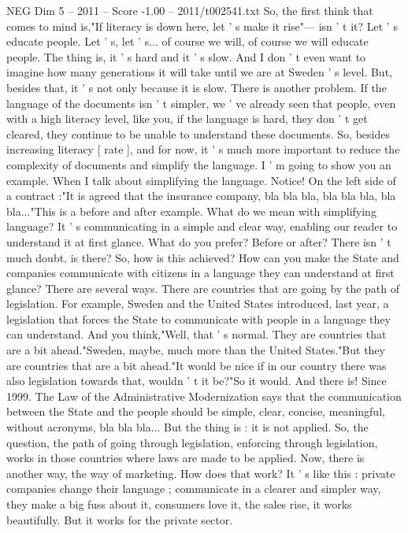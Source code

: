\begin{textsample}{NEG Dim 5 – 2011 – Score -1.00 – 2011/t002541.txt}
So, the first think that comes to mind is,"If literacy is down here, let ' s make it rise"— isn ' t it?
Let ' s educate people.
Let ' s, let ' s... of course we will, of course we will educate people.
The thing is, it ' s hard and it ' s slow.
And I don ' t even want to imagine how many generations it will take until we are at Sweden ' s level.
But, besides that, it ' s not only because it is slow.
There is another problem.
If the language of the documents isn ' t simpler, we ' ve already seen that people, even with a high literacy level, like you, if the language is hard, they don ' t get cleared, they continue to be unable to understand these documents.
So, besides increasing literacy [ rate ], and for now, it ' s much more important to reduce the complexity of documents and simplify the language.
I ' m going to show you an example.
When I talk about simplifying the language.
Notice!
On the left side of a contract :"It is agreed that the insurance company, bla bla bla, bla bla bla, bla bla..."This is a before and after example.
What do we mean with simplifying language?
It ' s communicating in a simple and clear way, enabling our reader to understand it at first glance.
What do you prefer?
Before or after?
There isn ' t much doubt, is there?
So, how is this achieved?
How can you make the State and companies communicate with citizens in a language they can understand at first glance?
There are several ways.
There are countries that are going by the path of legislation.
For example, Sweden and the United States introduced, last year, a legislation that forces the State to communicate with people in a language they can understand.
And you think,"Well, that ' s normal.
They are countries that are a bit ahead."Sweden, maybe, much more than the United States."But they are countries that are a bit ahead."It would be nice if in our country there was also legislation towards that, wouldn ' t it be?"So it would.
And there is!
Since 1999.
The Law of the Administrative Modernization says that the communication between the State and the people should be simple, clear, concise, meaningful, without acronyms, bla bla bla...
But the thing is : it is not applied.
So, the question, the path of going through legislation, enforcing through legislation, works in those countries where laws are made to be applied.
Now, there is another way, the way of marketing.
How does that work?
It ' s like this : private companies change their language ; communicate in a clearer and simpler way, they make a big fuss about it, consumers love it, the sales rise, it works beautifully.
But it works for the private sector.

\end{textsample}
